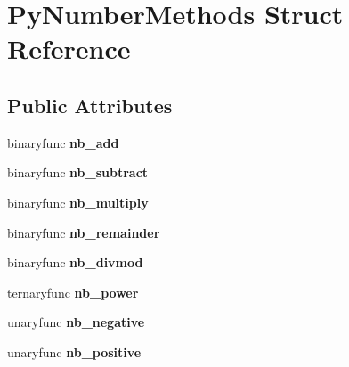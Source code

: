 \hypertarget{structPyNumberMethods}{}\section{Py\+Number\+Methods Struct Reference}
\label{structPyNumberMethods}
\subsection*{Public Attributes}
\begin{DoxyCompactItemize}
\item 
binaryfunc {\bfseries nb\+\_\+add}\hypertarget{structPyNumberMethods_ada624d95704d8ec3491a6e6473b5c6af}{}\label{structPyNumberMethods_ada624d95704d8ec3491a6e6473b5c6af}

\item 
binaryfunc {\bfseries nb\+\_\+subtract}\hypertarget{structPyNumberMethods_aa92ce9adbe4345ed779e32fbec1633b9}{}\label{structPyNumberMethods_aa92ce9adbe4345ed779e32fbec1633b9}

\item 
binaryfunc {\bfseries nb\+\_\+multiply}\hypertarget{structPyNumberMethods_a6c2361df75359a95de536c0bba3b0ebc}{}\label{structPyNumberMethods_a6c2361df75359a95de536c0bba3b0ebc}

\item 
binaryfunc {\bfseries nb\+\_\+remainder}\hypertarget{structPyNumberMethods_ac5faf4e85e1044648b75d87b980810f6}{}\label{structPyNumberMethods_ac5faf4e85e1044648b75d87b980810f6}

\item 
binaryfunc {\bfseries nb\+\_\+divmod}\hypertarget{structPyNumberMethods_a993851f9a4d1ad172b8d3cf94382cb20}{}\label{structPyNumberMethods_a993851f9a4d1ad172b8d3cf94382cb20}

\item 
ternaryfunc {\bfseries nb\+\_\+power}\hypertarget{structPyNumberMethods_a41e3d866693e4d036b8f6c19e005d2e0}{}\label{structPyNumberMethods_a41e3d866693e4d036b8f6c19e005d2e0}

\item 
unaryfunc {\bfseries nb\+\_\+negative}\hypertarget{structPyNumberMethods_a0a4cb6e0aa1d4f2846ad198931c53af0}{}\label{structPyNumberMethods_a0a4cb6e0aa1d4f2846ad198931c53af0}

\item 
unaryfunc {\bfseries nb\+\_\+positive}\hypertarget{structPyNumberMethods_adca8072483c63243de4d26d0575e6e8d}{}\label{structPyNumberMethods_adca8072483c63243de4d26d0575e6e8d}


\end{DoxyCompactItemize}
